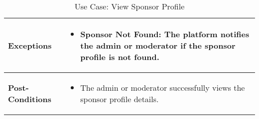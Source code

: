 \begin{table}[!ht]
\begin{tabularx}{\textwidth}{|l|X|}
        \textbf{Exceptions} & 
        \begin{itemize}[label=--,itemsep=0pt]
            \item Sponsor Not Found: The platform notifies the admin or moderator if the sponsor profile is not found.
        \end{itemize} \\
        \hline
        \textbf{Post-Conditions} & 
        \begin{itemize}[label=--,itemsep=0pt]
            \item The admin or moderator successfully views the sponsor profile details.
        \end{itemize} \\
        \hline
    \end{tabularx}
    \caption{Use Case: View Sponsor Profile}
    \label{tab:use-case-view-sponsor-profile}
\end{table}


